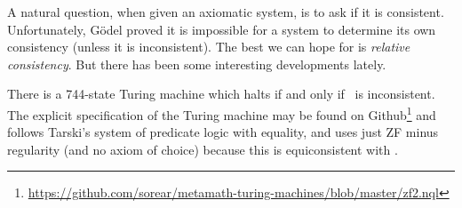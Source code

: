 \begin{node}\label{set:zfc-000G}%
A natural question, when given an axiomatic system, is to ask if it is
consistent. Unfortunately, G\"{o}del proved it is impossible for a
system to determine its own consistency (unless it is inconsistent). The
best we can hope for is \emph{relative consistency}. But there has been
some interesting developments lately.

\begin{node}\label{set-0002}%
There is a 744-state Turing machine which halts if and only if \ZFC\ is
inconsistent. The explicit specification of the Turing
machine may be found on Github\footnote{\url{https://github.com/sorear/metamath-turing-machines/blob/master/zf2.nql}}
and follows Tarski's system of predicate logic with equality, and uses
just ZF minus regularity (and no axiom of choice) because this is
equiconsistent with \ZFC.


\end{node}
\end{node}
